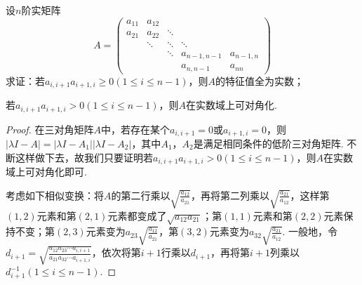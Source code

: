 \documentclass[../../main.tex]{subfiles}%
\begin{document}
\begin{proposition}[三对角矩阵可对角化的条件]\label{proposition:例9.74}
设\(n\)阶实矩阵
\[
A = 
\begin{pmatrix}
a_{11} & a_{12} & & & \\
a_{21} & a_{22} & \ddots & & \\
& \ddots & \ddots & \ddots & \\
& & \ddots & a_{n - 1,n - 1} & a_{n - 1,n} \\
& & & a_{n,n - 1} & a_{n n}
\end{pmatrix}
\]
求证：若\(a_{i,i + 1}a_{i + 1,i}\geqslant 0(1\leqslant  i\leqslant  n - 1)\)，则\(A\)的特征值全为实数；

若\(a_{i,i + 1}a_{i + 1,i}>0(1\leqslant  i\leqslant  n - 1)\)，则\(A\)在实数域上可对角化.
\end{proposition}
\begin{proof}
在三对角矩阵\(A\)中，若存在某个\(a_{i,i + 1}=0\)或\(a_{i + 1,i}=0\)，则\(\vert\lambda I - A\vert=\vert\lambda I - A_1\vert\vert\lambda I - A_2\vert\)，其中\(A_1\)，\(A_2\)是满足相同条件的低阶三对角矩阵. 不断这样做下去，故我们只要证明若\(a_{i,i + 1}a_{i + 1,i}>0(1\leqslant  i\leqslant  n - 1)\)，则\(A\)在实数域上可对角化即可. 

考虑如下相似变换：将\(A\)的第二行乘以\(\sqrt{\frac{a_{12}}{a_{21}}}\)，再将第二列乘以\(\sqrt{\frac{a_{21}}{a_{12}}}\)，这样第\((1,2)\)元素和第\((2,1)\)元素都变成了\(\sqrt{a_{12}a_{21}}\)；第\((1,1)\)元素和第\((2,2)\)元素保持不变；第\((2,3)\)元素变为\(a_{23}\sqrt{\frac{a_{12}}{a_{21}}}\)，第\((3,2)\)元素变为\(a_{32}\sqrt{\frac{a_{21}}{a_{12}}}\). 一般地，令\(d_{i + 1}=\sqrt{\frac{a_{12}a_{23}\cdots a_{i,i + 1}}{a_{21}a_{32}\cdots a_{i + 1,i}}}\)，依次将第\(i + 1\)行乘以\(d_{i + 1}\)，再将第\(i + 1\)列乘以\(d_{i + 1}^{-1}(1\leqslant  i\leqslant  n - 1)\).


\end{proof}
\end{document}
